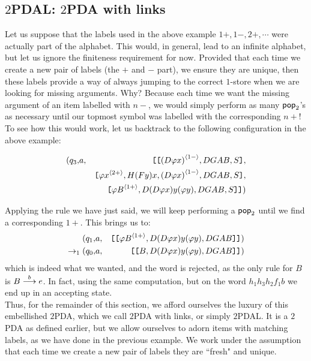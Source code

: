 \subsection{$2$PDAL: $2$PDA with links}

Let us suppose that the labels used in the above example $1+, 1-,
2+, \cdots$ were actually part of the alphabet. This would, in
general, lead to an infinite alphabet, but let us ignore the
finiteness requirement for now. Provided that each time we create
a new pair of labels (the $+$ and $-$ part), we ensure they are
unique, then these labels provide a way of always jumping to the
correct $1$-store when we are looking for missing arguments. Why?
Because each time we want the missing argument of an item labelled
with $n-$, we would simply perform as many ${\sf pop}_2$'s as necessary
until our topmost symbol was labelled with the corresponding $n+$!
To see how this would work, let us backtrack to the following
configuration in the above example:

\begin{eqnarray}
\nonumber (q_3, & a, &  \hbox{\tt [}\hbox{\tt [}{{(D \varphi x)}^{\langle{1-}\rangle}, DGAB, S}\hbox{\tt ]},\\
\nonumber && \hbox{\tt [}{{\varphi x}^{\langle{2+}\rangle},H (F y) x,{(D \varphi x)}^{\langle{1-}\rangle}, DGAB, S}\hbox{\tt ]},\\
\nonumber &&\hbox{\tt [}{{\varphi B}^{\langle{1+}\rangle}, D (D \varphi x) y (\varphi
y), DGAB,S}\hbox{\tt ]}\hbox{\tt ]})
\end{eqnarray}

Applying the rule we have just said, we will keep performing a ${\sf pop}_2$ until we find a corresponding $1+$. This brings us to:
\begin{eqnarray}
\nonumber (q_1, & a, &  \hbox{\tt [}{\hbox{\tt [}{{\varphi B}^{\langle{1+}\rangle}, D (D
\varphi x) y (\varphi y), DGAB}\hbox{\tt ]}}\hbox{\tt ]})\\
\nonumber \rightarrow_1 (q_0, & a, &\hbox{\tt [}{\hbox{\tt [}{B , D (D
\varphi x) y (\varphi y), DGAB}\hbox{\tt ]}}\hbox{\tt ]} )
\end{eqnarray}
which is indeed what we wanted, and the word is rejected, as the
only rule for $B$ is $B \stackrel{{b}}{\longrightarrow} e$. In fact, using the same
computation, but on the word $h_1h_3h_2f_1b$ we end up in an
accepting state.\\

Thus, for the remainder of this section, we afford ourselves the
luxury of this embellished $2$PDA, which we call $2$PDA with links, or
simply $2$PDAL. It is a $2$PDA as defined earlier, but we allow
ourselves to adorn items with matching labels, as we have done in the
previous example. We work under the assumption that each time we
create a new pair of labels they are ``fresh" and unique.

